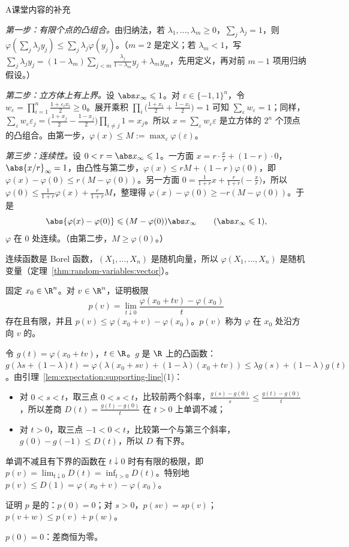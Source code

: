 \begin{exercises}{A}{课堂内容的补充}
\begin{questions}
\begin{solution}
\emph{第一步：有限个点的凸组合。}由归纳法，若 $\lambda_1,\dots,\lambda_m\geqslant0$，$\sum_j\lambda_j=1$，则 $\varphi(\sum_j\lambda_jy_j)\leqslant\sum_j\lambda_j\varphi(y_j)$。（$m=2$ 是定义；若 $\lambda_m<1$，写 $\sum_j\lambda_jy_j=(1-\lambda_m)\sum_{j<m}\frac{\lambda_j}{1-\lambda_m}y_j+\lambda_my_m$，先用定义，再对前 $m-1$ 项用归纳假设。）

\emph{第二步：立方体上有上界。}设 $\abs x_\infty\leqslant1$。对 $\varepsilon\in\{-1,1\}^n$，令 $w_\varepsilon=\prod_{i=1}^n\frac{1+\varepsilon_ix_i}2\geqslant0$。展开乘积 $\prod_i\bigl(\frac{1+x_i}2+\frac{1-x_i}2\bigr)=1$ 可知 $\sum_\varepsilon w_\varepsilon=1$；同样，$\sum_\varepsilon w_\varepsilon\varepsilon_j=\bigl(\frac{1+x_j}2-\frac{1-x_j}2\bigr)\prod_{i\neq j}1=x_j$。所以 $x=\sum_\varepsilon w_\varepsilon\varepsilon$ 是立方体的 $2^n$ 个顶点的凸组合。由第一步，$\varphi(x)\leqslant M:=\max_\varepsilon\varphi(\varepsilon)$。

\emph{第三步：连续性。}设 $0<r=\abs x_\infty\leqslant1$。一方面 $x=r\cdot\frac xr+(1-r)\cdot0$，$\abs{x/r}_\infty=1$，由凸性与第二步，$\varphi(x)\leqslant r M+(1-r)\varphi(0)$，即 $\varphi(x)-\varphi(0)\leqslant r(M-\varphi(0))$。另一方面 $0=\frac1{1+r}x+\frac r{1+r}\bigl(-\frac xr\bigr)$，所以 $\varphi(0)\leqslant\frac1{1+r}\varphi(x)+\frac r{1+r}M$，整理得 $\varphi(x)-\varphi(0)\geqslant-r(M-\varphi(0))$。于是
\[
\abs{\varphi(x)-\varphi(0)}\leqslant(M-\varphi(0))\abs x_\infty\qquad(\abs x_\infty\leqslant1),
\]
$\varphi$ 在 $0$ 处连续。（由第二步，$M\geqslant\varphi(0)$。）

连续函数是 Borel 函数，$(X_1,\dots,X_n)$ 是随机向量，所以 $\varphi(X_1,\dots,X_n)$ 是随机变量（定理~\ref{thm:random-variables:vector}）。
\end{solution}
\item 固定 $x_0\in\R^n$。对 $v\in\R^n$，证明极限
\[
p(v)=\lim_{t\downarrow0}\frac{\varphi(x_0+tv)-\varphi(x_0)}t
\]
存在且有限，并且 $p(v)\leqslant\varphi(x_0+v)-\varphi(x_0)$。$p(v)$ 称为 $\varphi$ 在 $x_0$ 处沿方向 $v$ 的。
\begin{solution}
令 $g(t)=\varphi(x_0+tv)$，$t\in\R$。$g$ 是 $\R$ 上的凸函数：$g(\lambda s+(1-\lambda)t)=\varphi(\lambda(x_0+sv)+(1-\lambda)(x_0+tv))\leqslant\lambda g(s)+(1-\lambda)g(t)$。由引理~\ref{lem:expectation:supporting-line}(1)：
\begin{itemize}
\item 对 $0<s<t$，取三点 $0<s<t$，比较前两个斜率，$\frac{g(s)-g(0)}s\leqslant\frac{g(t)-g(0)}t$，所以差商 $D(t)=\frac{g(t)-g(0)}t$ 在 $t>0$ 上单调不减；
\item 对 $t>0$，取三点 $-1<0<t$，比较第一个与第三个斜率，$g(0)-g(-1)\leqslant D(t)$，所以 $D$ 有下界。
\end{itemize}
单调不减且有下界的函数在 $t\downarrow0$ 时有有限的极限，即 $p(v)=\lim_{t\downarrow0}D(t)=\inf_{t>0}D(t)$。特别地 $p(v)\leqslant D(1)=\varphi(x_0+v)-\varphi(x_0)$。
\end{solution}
\item 证明 $p$ 是的：$p(0)=0$；对 $s>0$，$p(sv)=sp(v)$；$p(v+w)\leqslant p(v)+p(w)$。
\begin{solution}
$p(0)=0$：差商恒为零。


\end{solution}
\end{questions}
\end{exercises}
